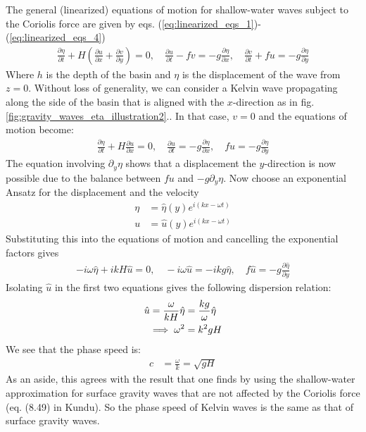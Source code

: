 \documentclass[a4paper, 12pt]{article}
\numberwithin{equation}{subsubsection}
\begin{document}
The general (linearized) equations of motion for shallow-water waves subject to the Coriolis force are given by eqs. (\ref{eq:linearized_eqs_1})-(\ref{eq:linearized_eqs_4})
\begin{align*}
    \frac{\partial \eta}{\partial t} + H \left(\frac{\partial u}{\partial x} + \frac{\partial v}{\partial y}\right) = 0, \quad \frac{\partial u}{\partial t} - fv = - g \frac{\partial \eta}{\partial x}, \quad \frac{\partial v}{\partial t} + fu = - g \frac{\partial \eta}{\partial y}
\end{align*}
Where $h$ is the depth of the basin and $\eta$ is the displacement of the wave from $z=0$. Without loss of generality, we can consider a Kelvin wave propagating along the side of the basin that is aligned with the $x$-direction as in fig. \ref{fig:gravity_waves_eta_illustration2}.. In that case, $v=0$ and the equations of motion become:
\begin{align*}
    \frac{\partial \eta}{\partial t} + H \frac{\partial u}{\partial x} = 0, \quad \frac{\partial u}{\partial t} = - g \frac{\partial \eta}{\partial x}, \quad fu = - g \frac{\partial \eta}{\partial y}
\end{align*}
The equation involving $\partial_y \eta$ shows that a displacement the $y$-direction is now possible due to the balance between $fu$ and $-g\partial_y \eta$. Now choose an exponential Ansatz for the displacement and the velocity
\begin{align}
	\eta &= \hat{\eta} (y) e^{i(kx - \omega t)} \\
	u &= \hat{u} (y) e^{i(kx - \omega t)}
\end{align}
Substituting this into the equations of motion and cancelling the exponential factors gives
\begin{align*}
    - i \omega \hat{\eta} + i k H \hat{u} = 0, \quad - i \omega \hat{u} = - i k g \hat{\eta}, \quad f \hat{u} = - g \frac{\partial \hat{\eta}}{\partial y}
\end{align*}
Isolating $\hat{u}$ in the first two equations gives the following dispersion relation:
\begin{align}
    \hat{u} = \frac{\omega}{k H} \hat{\eta} &= \frac{kg}{\omega} \hat{\eta} \notag \\
    \implies \omega^2 &= k^2 g H
\end{align}
We see that the phase speed is:
\begin{align}
    c &= \frac{\omega}{k} = \sqrt{g H}
\end{align}
As an aside, this agrees with the result that one finds by using the shallow-water approximation for surface gravity waves that are not affected by the Coriolis force (eq. (8.49) in Kundu). So the phase speed of Kelvin waves is the same as that of surface gravity waves.
\end{document}
